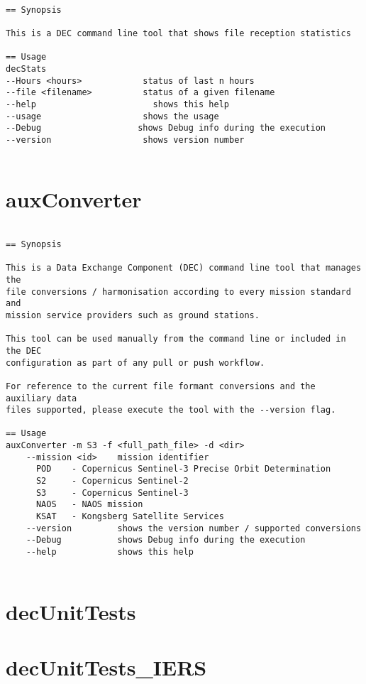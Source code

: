 \documentclass[dec_sum_main.tex]{subfiles}
\begin{document}
\begin{verbatim}

== Synopsis

This is a DEC command line tool that shows file reception statistics  

== Usage
decStats
--Hours <hours>            status of last n hours
--file <filename>          status of a given filename
--help                     	 shows this help
--usage                    shows the usage
--Debug                   shows Debug info during the execution
--version                  shows version number


\end{verbatim}

\label{auxConverter}
\section{auxConverter}

\begin{verbatim}

== Synopsis

This is a Data Exchange Component (DEC) command line tool that manages the
file conversions / harmonisation according to every mission standard and 
mission service providers such as ground stations.

This tool can be used manually from the command line or included in the DEC
configuration as part of any pull or push workflow.

For reference to the current file formant conversions and the auxiliary data
files supported, please execute the tool with the --version flag.

== Usage
auxConverter -m S3 -f <full_path_file> -d <dir>
    --mission <id>    mission identifier
      POD    - Copernicus Sentinel-3 Precise Orbit Determination
      S2     - Copernicus Sentinel-2
      S3     - Copernicus Sentinel-3
      NAOS   - NAOS mission
      KSAT   - Kongsberg Satellite Services
    --version         shows the version number / supported conversions
    --Debug           shows Debug info during the execution
    --help            shows this help


\end{verbatim}


\section{decUnitTests}

\section{decUnitTests\_IERS}
\end{document}
